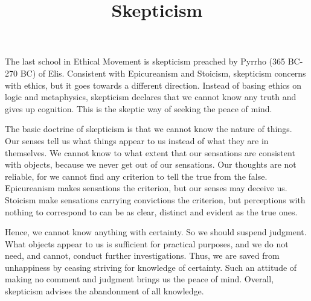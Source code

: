 \documentclass[11pt]{article}
\title{Skepticism}
\date{}
\begin{document}
  \maketitle

  \linenumbers
  
The last school in Ethical Movement is skepticism preached by Pyrrho (365 BC-270 BC) of Elis. 
Consistent with Epicureanism and Stoicism, skepticism concerns with ethics, but it goes towards a different direction. 
Instead of basing ethics on logic and metaphysics, skepticism declares that we cannot know any truth and gives up cognition. 
This is the skeptic way of seeking the peace of mind.

\newline

The basic doctrine of skepticism is that we cannot know the nature of things. 
Our senses tell us what things appear to us instead of what they are in themselves. 
We cannot know to what extent that our sensations are consistent with objects, because we never get out of our sensations. 
Our thoughts are not reliable, for we cannot find any criterion to tell the true from the false. 
Epicureanism makes sensations the criterion, but our senses may deceive us. 
Stoicism make sensations carrying convictions the criterion, but perceptions with nothing to correspond to can be as clear, distinct and evident as the true ones.

\newline

Hence, we cannot know anything with certainty. 
So we should suspend judgment. 
What objects appear to us is sufficient for practical purposes, and we do not need, and cannot, conduct further investigations. 
Thus, we are saved from unhappiness by ceasing striving for knowledge of certainty. 
Such an attitude of making no comment and judgment brings us the peace of mind. 
Overall, skepticism advises the abandonment of all knowledge.
\end{document}
